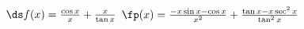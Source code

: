 {$\ds f(x) = \frac{\cos x}{x} + \frac{x}{\tan x}$
}
{$\fp(x) = \frac{-x\sin x - \cos x}{x^2} + \frac{\tan x -x\sec^2x}{\tan^2x}$
}
